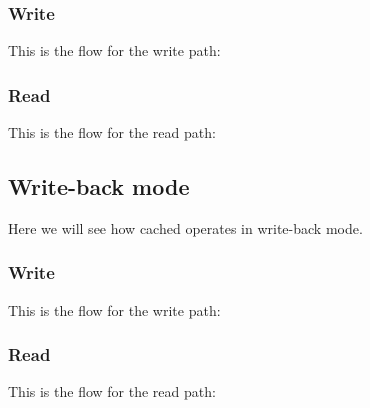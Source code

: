 \subsubsection{Write}

This is the flow for the write path:

\subsubsection{Read}

This is the flow for the read path:

\subsection{Write-back mode}

Here we will see how cached operates in write-back mode.

\subsubsection{Write}

This is the flow for the write path:

\subsubsection{Read}

This is the flow for the read path:

